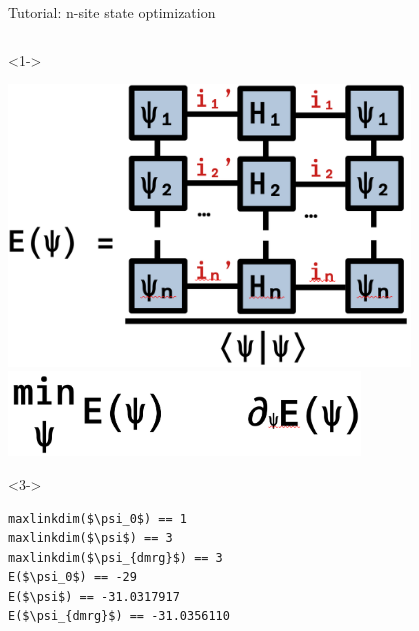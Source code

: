 \begin{frame}[fragile]{Tutorial: n-site state optimization}
\begin{columns}
\begin{column}{5.5cm}
\begin{onlyenv}<1->
\vspace*{0.0cm}
\begin{center}
\includegraphics[width=0.8\textwidth]{
  slides/assets/psin_H_psin.png
} \\
\includegraphics[width=0.7\textwidth]{
  slides/assets/min_grad_E_psi.png
}
\end{center}
\vspace*{0.0cm}
\end{onlyenv}

\begin{onlyenv}<3->
\begin{lstlisting}[language=JuliaLocal, style=julia, mathescape, basicstyle=\scriptsize\ttfamily]
maxlinkdim($\psi_0$) == 1
maxlinkdim($\psi$) == 3
maxlinkdim($\psi_{dmrg}$) == 3
E($\psi_0$) == -29
E($\psi$) == -31.0317917
E($\psi_{dmrg}$) == -31.0356110
\end{lstlisting}
~\\
~\\
\end{onlyenv}


\end{column}

\end{columns}

\end{frame}
